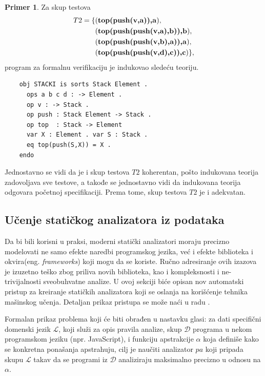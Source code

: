 \documentclass[a4paper]{article}
\theoremstyle{definition}
\newtheorem{primer}{Primer}[section]
\begin{document}
{\begin{primer}
Za skup testova
\begin{eqnarray*}T2 = \{&(\mbox{\textbf{top(push(v,a)),a}}),\\
&(\mbox{\textbf{top(push(push(v,a),b)),b}}),\\
&(\mbox{\textbf{top(push(push(v,b),a)),a}}),\\
&(\mbox{\textbf{top(push(push(v,d),c)),c}})\},
\end{eqnarray*}
program za formalnu verifikaciju je indukovao sledeću teoriju.
\begin{verbatim}
	obj STACKI is sorts Stack Element .
	  ops a b c d : -> Element .
	  op v : -> Stack .
	  op push : Stack Element -> Stack .
	  op top  : Stack -> Element
	  var X : Element . var S : Stack .
	  eq top(push(S,X)) = X .
	endo
\end{verbatim}
Jednostavno se vidi da je i skup testova $T2$ koherentan, pošto indukovana teorija zadovoljava sve testove, a takođe se jednostavno vidi da indukovana teorija odgovara početnoj specifikaciji. Prema tome, skup testova $T2$ je i adekvatan.
\end{primer}

\subsection{Učenje statičkog analizatora iz podataka}

Da bi bili korisni u praksi, moderni statički analizatori moraju precizno 
modelovati ne samo efekte naredbi programskog jezika, već i efekte biblioteka 
i okvira(eng. \emph{frameworks}) koji mogu da se koriste. Ručno adresiranje ovih izazova 
je izuzetno teško zbog priliva novih biblioteka, kao i kompleksnosti i 
ne-trivijalnosti sveobuhvatne analize. U ovoj sekciji biće opisan nov 
automatski pristup za kreiranje statičkih analizatora koji se oslanja na 
korišćenje tehnika mašinskog učenja. Detaljan prikaz pristupa se može naći 
u radu \cite{staticAnalyzer}.

Formalan prikaz problema koji će biti obrađen u nastavku glasi: za dati 
specifični domenski jezik $\mathcal{L}$, koji služi za opis pravila analize, 
skup $\mathcal{D}$ programa u nekom programskom jeziku (npr. JavaScript), i 
funkciju apstrakcije $\alpha$ koja definiše kako se konkretna ponašanja 
apstrahuju, cilj je naučiti analizator $pa$ koji pripada skupu $\mathcal{L}$ 
takav da se programi iz $\mathcal{D}$ analiziraju maksimalno precizno u odnosu 
na $\alpha$.


}
\end{document}
